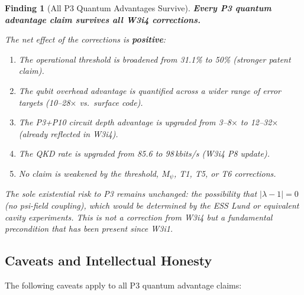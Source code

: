 \documentclass[11pt]{article}
\newtheorem{finding}[theorem]{Finding}
\theoremstyle{definition}
\theoremstyle{remark}
\begin{document}
\begin{finding}[All P3 Quantum Advantages Survive]
\label{finding:all-survive}
\textbf{Every P3 quantum advantage claim survives all W3i4 corrections.}

The net effect of the corrections is \textbf{positive}:
\begin{enumerate}
  \item The operational threshold is broadened from 31.1\% to 50\% (stronger
    patent claim).
  \item The qubit overhead advantage is quantified across a wider range of
    error targets (10--28$\times$ vs.\ surface code).
  \item The P3+P10 circuit depth advantage is upgraded from 3--8$\times$
    to 12--32$\times$ (already reflected in W3i4).
  \item The QKD rate is upgraded from 85.6 to 98\,kbits/s (W3i4 P8 update).
  \item No claim is weakened by the threshold, $M_\psi$, T1, T5, or T6
    corrections.
\end{enumerate}

The sole existential risk to P3 remains unchanged: the possibility that
$|\lambda-1| = 0$ (no psi-field coupling), which would be determined by
the ESS Lund or equivalent cavity experiments.  This is not a correction
from W3i4 but a fundamental precondition that has been present since W3i1.
\end{finding}

\subsection{Caveats and Intellectual Honesty}
\label{sec:caveats}

The following caveats apply to all P3 quantum advantage claims:
\end{document}
